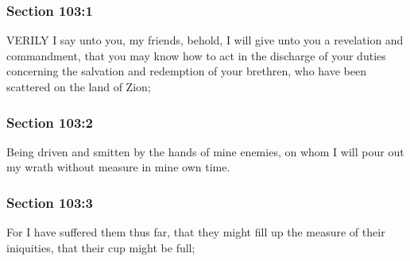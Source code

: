 	\subsubsection{Section 103:1} %
		\label{DC103-1}

		VERILY I say unto you, my friends, behold, I will give unto you a revelation and commandment, that you may know how to act in the discharge of your duties concerning the salvation and redemption of your brethren, who have been scattered on the land of Zion;


	\subsubsection{Section 103:2} %
		\label{DC103-2}

		Being driven and smitten by the hands of mine enemies, on whom I will pour out my wrath without measure in mine own time.


	\subsubsection{Section 103:3} %
		\label{DC103-3}

		For I have suffered them thus far, that they might fill up the measure of their iniquities, that their cup might be full;


